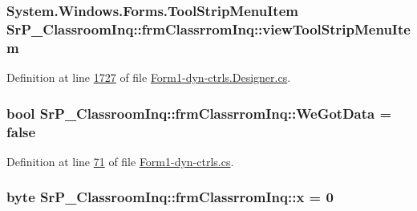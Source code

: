 \hypertarget{class_sr_p___classroom_inq_1_1frm_classrrom_inq_a703cf9f48d3d8aa2b88e8d9490600c54}{
\subsubsection[{view\-Tool\-Strip\-Menu\-Item}]{\setlength{\rightskip}{0pt plus 5cm}\-System.\-Windows.\-Forms.\-Tool\-Strip\-Menu\-Item {\bf \-Sr\-P\-\_\-\-Classroom\-Inq\-::frm\-Classrrom\-Inq\-::view\-Tool\-Strip\-Menu\-Item}}}
\label{class_sr_p___classroom_inq_1_1frm_classrrom_inq_a703cf9f48d3d8aa2b88e8d9490600c54}


\-Definition at line \hyperlink{_form1-dyn-ctrls_8_designer_8cs_source_l01727}{1727} of file \hyperlink{_form1-dyn-ctrls_8_designer_8cs_source}{\-Form1-\/dyn-\/ctrls.\-Designer.\-cs}.

\hypertarget{class_sr_p___classroom_inq_1_1frm_classrrom_inq_a44eb31e84ef4705e39c15c4d6047807e}{
\subsubsection[{\-We\-Got\-Data}]{\setlength{\rightskip}{0pt plus 5cm}bool {\bf \-Sr\-P\-\_\-\-Classroom\-Inq\-::frm\-Classrrom\-Inq\-::\-We\-Got\-Data} = false}}
\label{class_sr_p___classroom_inq_1_1frm_classrrom_inq_a44eb31e84ef4705e39c15c4d6047807e}


\-Definition at line \hyperlink{_form1-dyn-ctrls_8cs_source_l00071}{71} of file \hyperlink{_form1-dyn-ctrls_8cs_source}{\-Form1-\/dyn-\/ctrls.\-cs}.

\hypertarget{class_sr_p___classroom_inq_1_1frm_classrrom_inq_ab6836b7a465c2251301a02d9da5c3c31}{
\subsubsection[{x}]{\setlength{\rightskip}{0pt plus 5cm}byte {\bf \-Sr\-P\-\_\-\-Classroom\-Inq\-::frm\-Classrrom\-Inq\-::x} = 0}}
\label{class_sr_p___classroom_inq_1_1frm_classrrom_inq_ab6836b7a465c2251301a02d9da5c3c31}



